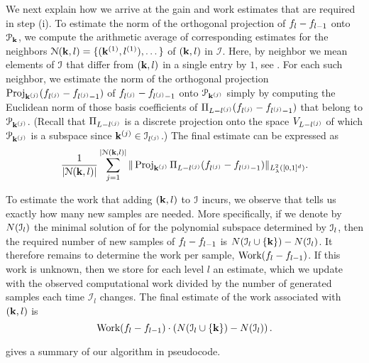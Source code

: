 We next explain how we arrive at the gain and work estimates that are required in step (i).
To estimate the norm of the orthogonal projection of $\rs_l-\rs_{l-1}$ onto $\pss_{\mi}$, we compute the arithmetic average of corresponding estimates for the neighbors $\neighbors(\mi,l)=\{(\mi^{(1)},l^{(1)}),\dots\}$ of $(\mi,l)$ in $\mathcal{I}$. Here, by neighbor we mean elements of $\mis$ that differ from $(\mi,l)$ in a single entry by $1$, see .
For each such neighbor, we estimate the norm of the orthogonal projection $\operatorname{Proj}_{\mi^{(j)}}(\rs_{l^{(j)}}-\rs_{l^{(j)}-1})$ of $\rs_{l^{(j)}}-\rs_{l^{(j)}-1}$ onto $\pss_{\mi^{(j)}}$ simply by computing the Euclidean norm of those basis coefficients of $\P_{L-l^{(j)}}(\rs_{l^{(j)}}-\rs_{l^{(j)}-1})$ that belong to $\pss_{\mi^{(j)}}$. (Recall that $\P_{L-l^{(j)}}$ is a discrete projection onto the space $\vsp_{L-l^{(j)}}$ of which $\pss_{\mi^{(j)}}$ is a subspace since $\mi^{(j)}\in\mis_{l^{(j)}}$.)
The final estimate can be expressed as
\begin{equation*}
\frac{1}{|\neighbors(\mi,l)|}\sum_{j=1}^{|\neighbors(\mi,l)|}\norm{\operatorname{Proj}_{\mi^{(j)}}\P_{L-l^{(j)}}(\rs_{l^{(j)}}-\rs_{l^{(j)}-1})}{L^2_{\lambda}([0,1]^d)}.
\end{equation*}


To estimate the work that adding $(\mi,l)$ to $\mis$ incurs, we observe that  tells us exactly how many new samples are needed. More specifically, if we denote by $\NS(\mis_{l})$ the minimal solution of  for the polynomial subspace determined by $\mis_l$, then the required number of new samples of $\rs_{l}-\rs_{l-1}$ is $\NS(\mis_{l}\cup\{\mi\})-\NS(\mis_{l})$. It therefore remains to determine the  work per sample,  $\work(\rs_{l}-\rs_{l-1})$. If this work is unknown, then we store for each level $l$ an estimate, which we update with the observed computational work divided by the number of generated samples each time $\mathcal{I}_{l}$ changes. The final estimate of the work associated with $(\mi,l)$ is
\begin{equation*}
  \work(\rs_{l}-\rs_{l-1}) \cdot\left(\NS(\mis_{l}\cup\{\mi\})-\NS(\mis_{l})\right).
\end{equation*}

 gives a summary of our algorithm in pseudocode.


